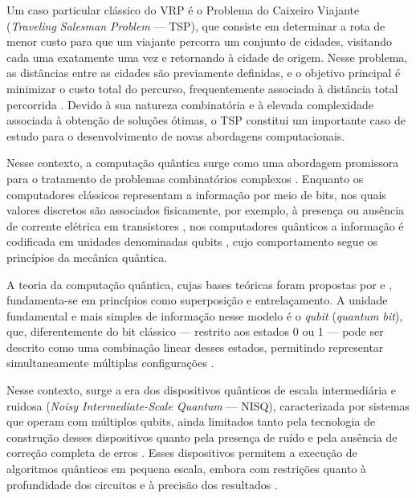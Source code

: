 Um caso particular clássico do VRP é o Problema do Caixeiro Viajante (\textit{Traveling Salesman Problem} — TSP), que consiste em determinar a rota de menor custo para que um viajante percorra um conjunto de cidades, visitando cada uma exatamente uma vez e retornando à cidade de origem. Nesse problema, as distâncias entre as cidades são previamente definidas, e o objetivo principal é minimizar o custo total do percurso, frequentemente associado à distância total percorrida \cite{dantzig1954solution, applegate2011traveling}. Devido à sua natureza combinatória e à elevada complexidade associada à obtenção de soluções ótimas, o TSP constitui um importante caso de estudo para o desenvolvimento de novas abordagens computacionais.

Nesse contexto, a computação quântica surge como uma abordagem promissora para o tratamento de problemas combinatórios complexos \cite{albash2018adiabatic}. Enquanto os computadores clássicos representam a informação por meio de bits, nos quais valores discretos são associados fisicamente, por exemplo, à presença ou ausência de corrente elétrica em transistores \cite{shannon1948mathematical, sedra2011microelectronic}, nos computadores quânticos a informação é codificada em unidades denominadas qubits \cite{benioff1980computer, nielsen_quantum_2002}, cujo comportamento segue os princípios da mecânica quântica.

A teoria da computação quântica, cujas bases teóricas foram propostas por \textcite{benioff1980computer} e \textcite{feynman1982simulating}, fundamenta-se em princípios como superposição e entrelaçamento. A unidade fundamental e mais simples de informação nesse modelo é o \textit{qubit} (\textit{quantum bit}), que, diferentemente do bit clássico — restrito aos estados 0 ou 1 — pode ser descrito como uma combinação linear desses estados, permitindo representar simultaneamente múltiplas configurações \cite{nielsen_quantum_2002}.

Nesse contexto, surge a era dos dispositivos quânticos de escala intermediária e ruidosa (\textit{Noisy Intermediate-Scale Quantum} — NISQ), caracterizada por sistemas que operam com múltiplos qubits, ainda limitados tanto pela tecnologia de construção desses dispositivos quanto pela presença de ruído e pela ausência de correção completa de erros \cite{preskill2019quantum}. Esses dispositivos permitem a execução de algoritmos quânticos em pequena escala, embora com restrições quanto à profundidade dos circuitos e à precisão dos resultados \cite{bharti2022noisy, cheng2023noisy}.

